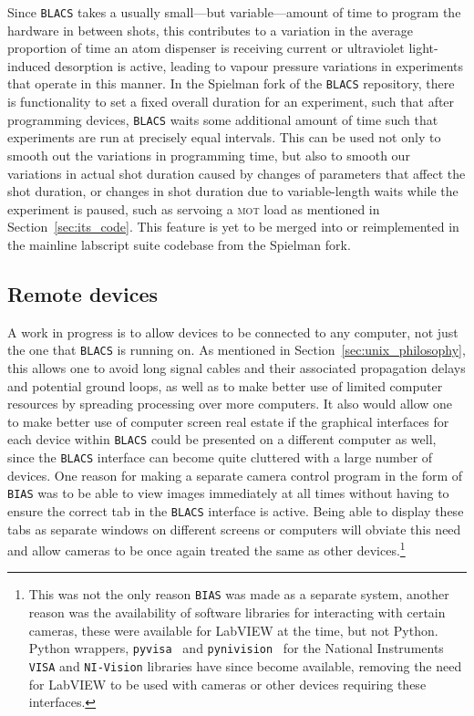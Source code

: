 Since \texttt{BLACS} takes a usually small---but variable---amount of time to program the hardware in between shots, this contributes to a variation in the average proportion of time an atom dispenser is receiving current or ultraviolet light-induced desorption is active, leading to vapour pressure variations in experiments that operate in this manner. In the Spielman fork of the \texttt{BLACS} repository, there is functionality to set a fixed overall duration for an experiment, such that after programming devices, \texttt{BLACS} waits some additional amount of time such that experiments are run at precisely equal intervals. This can be used not only to smooth out the variations in programming time, but also to smooth our variations in actual shot duration caused by changes of parameters that affect the shot duration, or changes in shot duration due to variable-length waits while the experiment is paused, such as servoing a \textsc{mot} load as mentioned in Section~\ref{sec:its_code}. This feature is yet to be merged into or reimplemented in the mainline labscript suite codebase from the Spielman fork.

\subsection{Remote devices}

A work in progress is to allow devices to be connected to any computer, not just the one that \texttt{BLACS} is running on. As mentioned in Section~\ref{sec:unix_philosophy}, this allows one to avoid long signal cables and their associated propagation delays and potential ground loops, as well as to make better use of limited computer resources by spreading processing over more computers. It also would allow one to make better use of computer screen real estate if the graphical interfaces for each device within \texttt{BLACS} could be presented on a different computer as well, since the \texttt{BLACS} interface can become quite cluttered with a large number of devices. One reason for making a separate camera control program in the form of \texttt{BIAS} was to be able to view images immediately at all times without having to ensure the correct tab in the \texttt{BLACS} interface is active. Being able to display these tabs as separate windows on different screens or computers will obviate this need and allow cameras to be once again treated the same as other devices.\footnote{This was not the only reason \texttt{BIAS} was made as a separate system, another reason was the availability of software libraries for interacting with certain cameras, these were available for LabVIEW at the time, but not Python. Python wrappers, \texttt{pyvisa}~\cite{torsten_bronger_pyvisa_2018} and \texttt{pynivision}~\cite{peter_johnson_frc_team_294_pynivision_2015} for the National Instruments \texttt{VISA} and \texttt{NI-Vision} libraries have since become available, removing the need for LabVIEW to be used with cameras or other devices requiring these interfaces.}

